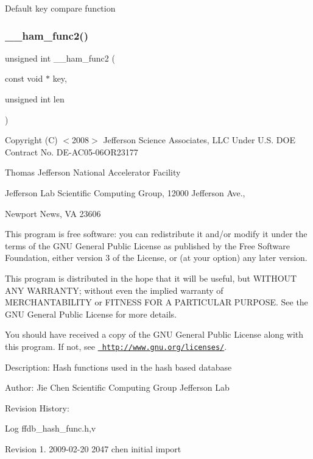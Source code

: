 Default key compare function \mbox{\label{adat-devel_2other__libs_2filedb_2filehash_2ffdb__hash__func_8h_a71d4674a43273f69f1116128d536a9bc}} 
\subsubsection{\texorpdfstring{\_\_ham\_func2()}{\_\_ham\_func2()}}
{\footnotesize\ttfamily unsigned int \+\_\+\+\_\+ham\+\_\+func2 (\begin{DoxyParamCaption}\item[{const void $\ast$}]{key,  }\item[{unsigned int}]{len }\end{DoxyParamCaption})}

Copyright (C) $<$2008$>$ Jefferson Science Associates, L\+LC Under U.\+S. D\+OE Contract No. D\+E-\/\+A\+C05-\/06\+O\+R23177

Thomas Jefferson National Accelerator Facility

Jefferson Lab Scientific Computing Group, 12000 Jefferson Ave.,

Newport News, VA 23606

This program is free software\+: you can redistribute it and/or modify it under the terms of the G\+NU General Public License as published by the Free Software Foundation, either version 3 of the License, or (at your option) any later version.

This program is distributed in the hope that it will be useful, but W\+I\+T\+H\+O\+UT A\+NY W\+A\+R\+R\+A\+N\+TY; without even the implied warranty of M\+E\+R\+C\+H\+A\+N\+T\+A\+B\+I\+L\+I\+TY or F\+I\+T\+N\+E\+SS F\+OR A P\+A\+R\+T\+I\+C\+U\+L\+AR P\+U\+R\+P\+O\+SE. See the G\+NU General Public License for more details.

You should have received a copy of the G\+NU General Public License along with this program. If not, see \href{http://www.gnu.org/licenses/}{\texttt{ http\+://www.\+gnu.\+org/licenses/}}. 

 Description\+: Hash functions used in the hash based database

Author\+: Jie Chen Scientific Computing Group Jefferson Lab

Revision History\+: \begin{DoxyParagraph}{Log}
ffdb\+\_\+hash\+\_\+func.\+h,v 
\end{DoxyParagraph}
Revision 1. 2009-\/02-\/20 2047 chen initial import \mbox{\label{adat-devel_2other__libs_2filedb_2filehash_2ffdb__hash__func_8h_aedf4585bfc48595964ad01644ad19e76}} 
